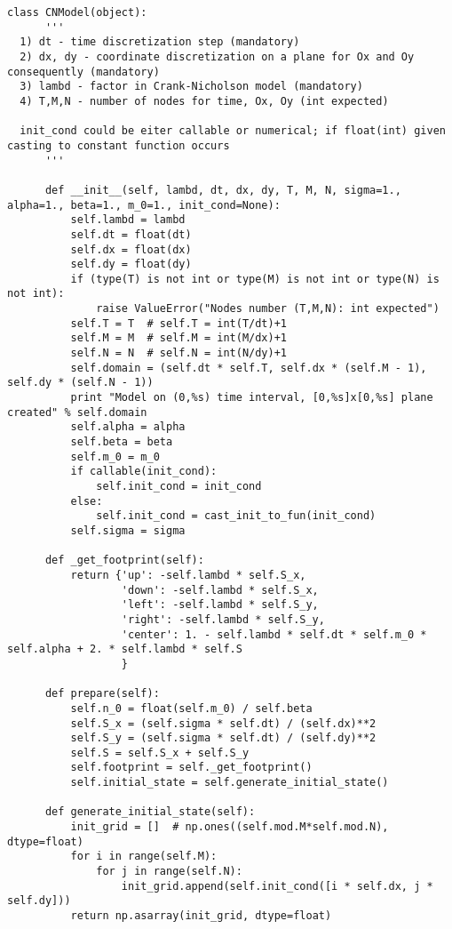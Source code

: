\begin{lstlisting}
class CNModel(object):
      '''
  1) dt - time discretization step (mandatory)
  2) dx, dy - coordinate discretization on a plane for Ox and Oy consequently (mandatory)
  3) lambd - factor in Crank-Nicholson model (mandatory)
  4) T,M,N - number of nodes for time, Ox, Oy (int expected)
  
  init_cond could be eiter callable or numerical; if float(int) given casting to constant function occurs
      '''
  
      def __init__(self, lambd, dt, dx, dy, T, M, N, sigma=1., alpha=1., beta=1., m_0=1., init_cond=None):
          self.lambd = lambd
          self.dt = float(dt)
          self.dx = float(dx)
          self.dy = float(dy)
          if (type(T) is not int or type(M) is not int or type(N) is not int):
              raise ValueError("Nodes number (T,M,N): int expected")
          self.T = T  # self.T = int(T/dt)+1
          self.M = M  # self.M = int(M/dx)+1
          self.N = N  # self.N = int(N/dy)+1
          self.domain = (self.dt * self.T, self.dx * (self.M - 1), self.dy * (self.N - 1))
          print "Model on (0,%s) time interval, [0,%s]x[0,%s] plane created" % self.domain
          self.alpha = alpha
          self.beta = beta
          self.m_0 = m_0
          if callable(init_cond):
              self.init_cond = init_cond
          else:
              self.init_cond = cast_init_to_fun(init_cond)
          self.sigma = sigma
  
      def _get_footprint(self):
          return {'up': -self.lambd * self.S_x,
                  'down': -self.lambd * self.S_x,
                  'left': -self.lambd * self.S_y,
                  'right': -self.lambd * self.S_y,
                  'center': 1. - self.lambd * self.dt * self.m_0 * self.alpha + 2. * self.lambd * self.S
                  }
  
      def prepare(self):
          self.n_0 = float(self.m_0) / self.beta
          self.S_x = (self.sigma * self.dt) / (self.dx)**2
          self.S_y = (self.sigma * self.dt) / (self.dy)**2
          self.S = self.S_x + self.S_y
          self.footprint = self._get_footprint()
          self.initial_state = self.generate_initial_state()
  
      def generate_initial_state(self):
          init_grid = []  # np.ones((self.mod.M*self.mod.N), dtype=float)
          for i in range(self.M):
              for j in range(self.N):
                  init_grid.append(self.init_cond([i * self.dx, j * self.dy]))
          return np.asarray(init_grid, dtype=float)
\end{lstlisting}
